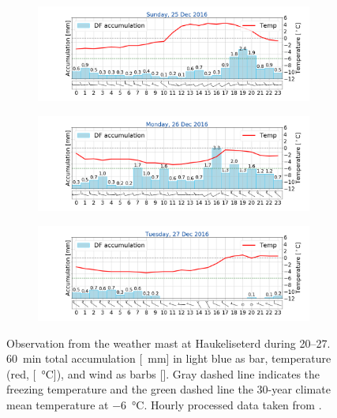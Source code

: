 \begin{figure}
\begin{subfigure}[b]{0.49\textwidth}
		\includegraphics[trim={4.9cm 1.cm 1.5cm 1cm},clip,
		width=\textwidth]{./fig_weathermast/T_P_U_20161225}
		\caption{}\label{fig:TPU25}
	\end{subfigure}
	\begin{subfigure}[b]{0.49\textwidth}
		\includegraphics[trim={4.9cm 1.cm 1.5cm 1cm},clip,
		width=\textwidth]{./fig_weathermast/T_P_U_20161226}
		\caption{}\label{fig:TPU26}
	\end{subfigure}
	\hfill
	\begin{subfigure}[b]{0.49\textwidth}
		\includegraphics[trim={4.9cm 1.cm 1.5cm 1cm},clip,
		width=\textwidth]{./fig_weathermast/T_P_U_20161227}
		\caption{}\label{fig:TPU27}
	\end{subfigure}
	\caption{Observation from the weather mast at Haukeliseterd during \SIrange{20}{27}{\dec}. \SI{60}{\minute} total accumulation [\SI{}{\mm}] in light blue as bar, temperature (red, [\SI{}{\celsius}]), and wind as barbs [\SI{}{\mPs}]. Gray dashed line indicates the freezing temperature and the green dashed line the 30-year climate mean temperature at \SI{-6}{\celsius}. Hourly processed data taken from \cite{eklima_norwegian_2016}.} \label{fig:TPU}
\end{figure}